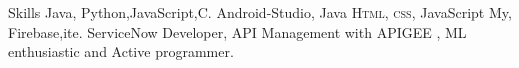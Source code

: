 
\begin{rubric}{Skills}
	Java,  Python,JavaScript,C. 
	Android-Studio, Java
	\textsc{Html, css}, JavaScript
\entry*[Databases]
	My, Firebase,ite.
\entry*[Misc.]
	ServiceNow Developer, API Management with APIGEE , ML enthusiastic and Active programmer.
\end{rubric}

